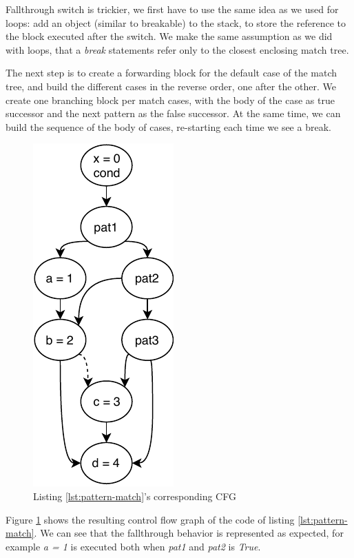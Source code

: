 \begin{enumerate}
	Fallthrough switch is trickier, we first have to use the same idea as we used for loops: add an object (similar to breakable) to the stack, to store the reference to the block executed after the switch.
	We make the same assumption as we did with loops, that a \emph{break} statements refer only to the closest enclosing match tree. 
	
	The next step is to create a forwarding block for the default case of the match tree, and build the different cases in the reverse order, one after the other. 
	We create one branching block per match cases, with the body of the case as true successor and the next pattern as the false successor. 
	At the same time, we can build the sequence of the body of cases, re-starting each time we see a break.
	
	
	
	\begin{figure}[h]
		\caption{Listing \ref{lst:pattern-match}'s corresponding CFG }
		\label{figure:pat-mat-cfg}
		\includegraphics[]{figure/pat-mat-cfg.pdf}
	\end{figure}
	
	Figure \ref{figure:pat-mat-cfg} shows the resulting control flow graph of the code of listing \ref{lst:pattern-match}. We can see that the fallthrough behavior is represented as expected, for example \emph{a = 1} is executed both when \emph{pat1} and \emph{pat2} is \emph{True}.
	

\end{enumerate}
